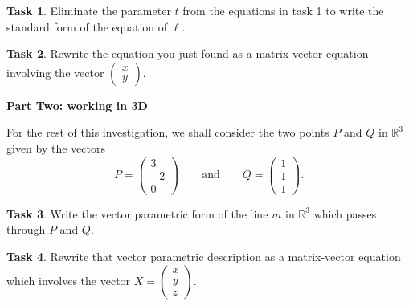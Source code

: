 \documentclass[11pt]{amsart}
\theoremstyle{definition}
\newtheorem{task}{Task}
\begin{document}
\vspace{.75in}


\begin{task}
Eliminate the parameter $t$ from the equations in task 1 to write the standard form of the equation of $\ell$.
\end{task}

\vspace{.75in}

\begin{task}
Rewrite the equation you just found as a matrix-vector equation involving the vector $\left(\begin{smallmatrix}x \\ y \end{smallmatrix}\right)$.
\end{task}

\vfill

\clearpage

\begin{center}\textbf{Part Two: working in 3D}\end{center}

For the rest of this investigation, we shall consider the two points $P$ and $Q$ in $\mathbb{R}^3$ given by the vectors
\[
P = \begin{pmatrix} 3 \\ -2 \\ 0\end{pmatrix} \qquad \text{and} \qquad
Q = \begin{pmatrix} 1 \\ 1 \\ 1 \end{pmatrix}.
\]

\begin{task}
Write the vector parametric form of the line $m$ in $\mathbb{R}^3$ which passes through $P$ and $Q$.
\end{task}

\vspace{1in}

\begin{task}
Rewrite that vector parametric description as a matrix-vector equation which involves the vector $X = \left( \begin{smallmatrix} x \\ y \\ z\end{smallmatrix} \right)$.
\end{task}

\vspace{1in}
\end{document}
